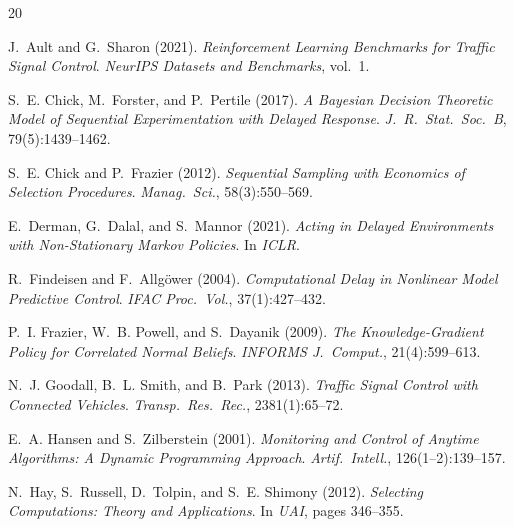 \begingroup
\footnotesize
\renewcommand{\section}[2]{\subsection*{References}}
\setlength{\bibsep}{1.2pt plus 0.5pt}
\begin{thebibliography}{20}

J.~Ault and G.~Sharon (2021). \emph{Reinforcement Learning Benchmarks for Traffic Signal Control}. \emph{NeurIPS Datasets and Benchmarks}, vol.~1.

S.~E. Chick, M.~Forster, and P.~Pertile (2017). \emph{A Bayesian Decision Theoretic Model of Sequential Experimentation with Delayed Response}. \emph{J.\ R.\ Stat.\ Soc.\ B}, 79(5):1439--1462.

S.~E. Chick and P.~Frazier (2012). \emph{Sequential Sampling with Economics of Selection Procedures}. \emph{Manag.\ Sci.}, 58(3):550--569.

E.~Derman, G.~Dalal, and S.~Mannor (2021). \emph{Acting in Delayed Environments with Non-Stationary Markov Policies}. In \emph{ICLR}.

R.~Findeisen and F.~Allg\"ower (2004). \emph{Computational Delay in Nonlinear Model Predictive Control}. \emph{IFAC Proc.\ Vol.}, 37(1):427--432.

P.~I. Frazier, W.~B. Powell, and S.~Dayanik (2009). \emph{The Knowledge-Gradient Policy for Correlated Normal Beliefs}. \emph{INFORMS J.\ Comput.}, 21(4):599--613.

N.~J. Goodall, B.~L. Smith, and B.~Park (2013). \emph{Traffic Signal Control with Connected Vehicles}. \emph{Transp.\ Res.\ Rec.}, 2381(1):65--72.

E.~A. Hansen and S.~Zilberstein (2001). \emph{Monitoring and Control of Anytime Algorithms: A Dynamic Programming Approach}. \emph{Artif.\ Intell.}, 126(1--2):139--157.

N.~Hay, S.~Russell, D.~Tolpin, and S.~E. Shimony (2012). \emph{Selecting Computations: Theory and Applications}. In \emph{UAI}, pages 346--355.


\end{thebibliography}
